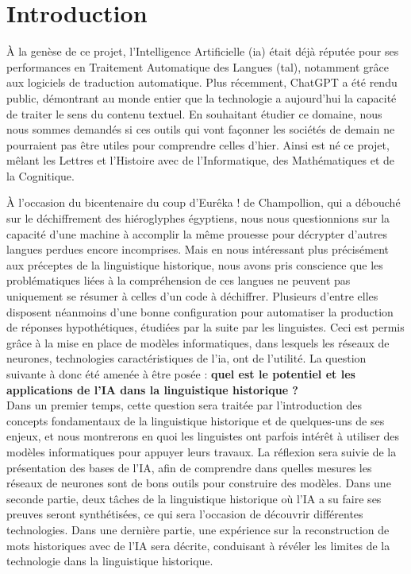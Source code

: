 \documentclass[12pt, twoside]{report}
\begin{document}
\tableofcontents
\listoffigures

\printglossary[title={Vocabulaire et Notations}, toctitle = {Vocabulaire et Notations}]

\chapter{Introduction}

À la genèse de ce projet, l'Intelligence Artificielle (\Gls{ia}) était déjà réputée pour ses performances en Traitement Automatique des Langues (\Gls{tal}), notamment grâce aux logiciels de traduction automatique. Plus récemment, ChatGPT \autocite{chatgpt} a été rendu public, démontrant au monde entier que la technologie a aujourd'hui la capacité de traiter le sens du contenu textuel. En souhaitant étudier ce domaine, nous nous sommes demandés si ces outils qui vont façonner les sociétés de demain ne pourraient pas être utiles pour comprendre celles d'hier. Ainsi est né ce projet, mêlant les Lettres et l'Histoire avec de l'Informatique, des Mathématiques et de la Cognitique.

À l'occasion du bicentenaire du coup d'\og Eurêka !\fg{} de Champollion, qui a débouché sur le déchiffrement des hiéroglyphes égyptiens, nous nous questionnions sur la capacité d'une machine à accomplir la même prouesse pour décrypter d'autres langues perdues encore incomprises. Mais en nous intéressant plus précisément aux préceptes de la linguistique historique, nous avons pris conscience que les problématiques liées à la compréhension de ces langues ne peuvent pas uniquement se résumer à celles d'un code à déchiffrer. Plusieurs d'entre elles disposent néanmoins d'une bonne configuration pour automatiser la production de réponses hypothétiques, étudiées par la suite par les linguistes. Ceci est permis grâce à la mise en place de modèles informatiques, dans lesquels les réseaux de neurones, technologies caractéristiques de l'\Gls{ia}, ont de l'utilité. La question suivante à donc été amenée à être posée : \textbf{quel est le potentiel et les applications de l'IA dans la linguistique historique ?}\\

Dans un premier temps, cette question sera traitée par l'introduction des concepts fondamentaux de la linguistique historique et de quelques-uns de ses enjeux, et nous montrerons en quoi les linguistes ont parfois intérêt à utiliser des modèles informatiques pour appuyer leurs travaux. La réflexion sera suivie de la présentation des bases de l'IA, afin de comprendre dans quelles mesures les réseaux de neurones sont de bons outils pour construire des modèles. 
Dans une seconde partie, deux tâches de la linguistique historique où l'IA a su faire ses preuves seront synthétisées, ce qui sera l'occasion de découvrir différentes technologies.
Dans une dernière partie, une expérience sur la reconstruction de mots historiques avec de l'IA sera décrite, conduisant à révéler les limites de la technologie dans la linguistique historique.
\end{document}
